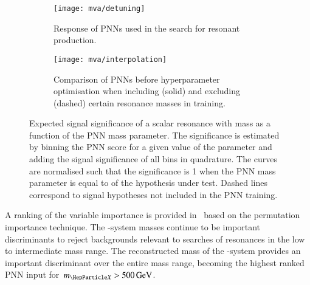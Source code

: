 \begin{figure}[htbp]
  \centering

  \begin{subfigure}[t]{.49\textwidth}
    \texttt{[image: mva/detuning]}
    \caption{Response of PNNs used in the search for resonant \HH production.}%
    \label{fig:pnn_detuning}
  \end{subfigure}\hfill%
  \begin{subfigure}[t]{.49\textwidth}
    \centering
    \texttt{[image: mva/interpolation]}
    \caption{Comparison of PNNs before hyperparameter optimisation when
      including (solid) and excluding (dashed) certain resonance masses in
      training.}%
    \label{fig:pnn_interpolation}
  \end{subfigure}

  \caption[Expected signal significance as a function of the PNN mass
  parameter.]{Expected signal significance of a scalar resonance with mass \mX
    as a function of the PNN mass parameter. The significance is estimated by
    binning the PNN score for a given value of the parameter and adding the
    signal significance of all bins in quadrature. The curves are normalised
    such that the significance is 1 when the PNN mass parameter is equal to \mX
    of the hypothesis under test. Dashed lines correspond to signal hypotheses
    not included in the PNN training.}%
  \label{fig:pnn_properties}
\end{figure}

A ranking of the variable importance is provided in~ based
on the permutation importance technique. The \PHiggs-system masses continue to
be important discriminants to reject backgrounds relevant to searches of
resonances in the low to intermediate mass range. The reconstructed mass of the
\HH-system provides an important discriminant over the entire mass range,
becoming the highest ranked PNN input for~$\mX > \SI{500}{\GeV}$.

